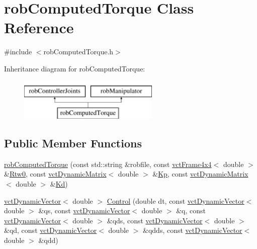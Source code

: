 \hypertarget{classrob_computed_torque}{\section{rob\-Computed\-Torque Class Reference}
\label{classrob_computed_torque}
}


{\ttfamily \#include $<$rob\-Computed\-Torque.\-h$>$}

Inheritance diagram for rob\-Computed\-Torque\-:\begin{figure}[H]
\begin{center}
\leavevmode
\includegraphics[height=2.000000cm]{d0/daa/classrob_computed_torque}
\end{center}
\end{figure}
\subsection*{Public Member Functions}
\begin{DoxyCompactItemize}
\item 
\hyperlink{classrob_computed_torque_a611038a87c486ab9735f2ca4e7981732}{rob\-Computed\-Torque} (const std\-::string \&robfile, const \hyperlink{classvct_frame4x4}{vct\-Frame4x4}$<$ double $>$ \&\hyperlink{classrob_manipulator_ab48d9d9a166bf252698bc35788ca6ad6}{Rtw0}, const \hyperlink{classvct_dynamic_matrix}{vct\-Dynamic\-Matrix}$<$ double $>$ \&\hyperlink{classrob_computed_torque_a11a6fdb06f86a2b81402c1c872c23484}{Kp}, const \hyperlink{classvct_dynamic_matrix}{vct\-Dynamic\-Matrix}$<$ double $>$ \&\hyperlink{classrob_computed_torque_acb199d8b884ccc02c1d47900c587eb79}{Kd})
\item 
\hyperlink{classvct_dynamic_vector}{vct\-Dynamic\-Vector}$<$ double $>$ \hyperlink{classrob_computed_torque_a7f861a30a5ee1a966fcfe0c41d58556d}{Control} (double dt, const \hyperlink{classvct_dynamic_vector}{vct\-Dynamic\-Vector}$<$ double $>$ \&qs, const \hyperlink{classvct_dynamic_vector}{vct\-Dynamic\-Vector}$<$ double $>$ \&q, const \hyperlink{classvct_dynamic_vector}{vct\-Dynamic\-Vector}$<$ double $>$ \&qds, const \hyperlink{classvct_dynamic_vector}{vct\-Dynamic\-Vector}$<$ double $>$ \&qd, const \hyperlink{classvct_dynamic_vector}{vct\-Dynamic\-Vector}$<$ double $>$ \&qdds, const \hyperlink{classvct_dynamic_vector}{vct\-Dynamic\-Vector}$<$ double $>$ \&qdd)
\end{DoxyCompactItemize}
